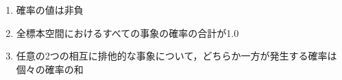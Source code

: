 \begin{enumerate}
	\item 確率の値は非負
	\item 全標本空間におけるすべての事象の確率の合計が1.0
	\item 任意の2つの相互に排他的な事象について，どちらか一方が発生する確率は個々の確率の和
\end{enumerate}
